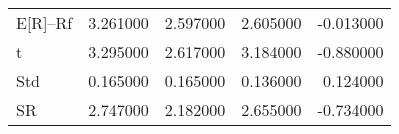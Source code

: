 \begin{tabular}{lrrrr}
\toprule
\midrule
E[R]--Rf & 3.261000 & 2.597000 & 2.605000 & -0.013000 \\
t & 3.295000 & 2.617000 & 3.184000 & -0.880000 \\
Std & 0.165000 & 0.165000 & 0.136000 & 0.124000 \\
SR & 2.747000 & 2.182000 & 2.655000 & -0.734000 \\
\bottomrule
\end{tabular}
